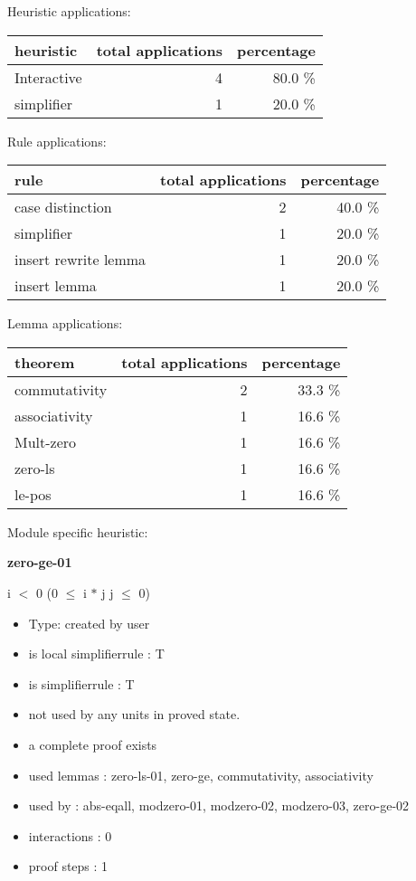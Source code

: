 \documentclass[a4paper]{article}
\begin{document}
\medskip


Heuristic applications:

\begin{supertabular}{l|r|r}
heuristic	& total applications & percentage \\ \hline
Interactive & 4 & 80.0 \% \\
simplifier & 1 & 20.0 \% \\

\end{supertabular}

Rule applications:

\begin{supertabular}{l|r|r}
rule	        & total applications & percentage \\ \hline
case distinction & 2 & 40.0 \% \\
simplifier & 1 & 20.0 \% \\
insert rewrite lemma & 1 & 20.0 \% \\
insert lemma & 1 & 20.0 \% \\

\end{supertabular}

Lemma applications:

\begin{supertabular}{l|r|r}
theorem	        & total applications & percentage \\ \hline
commutativity & 2 & 33.3 \% \\
associativity & 1 & 16.6 \% \\
Mult-zero & 1 & 16.6 \% \\
zero-ls & 1 & 16.6 \% \\
le-pos & 1 & 16.6 \% \\

\end{supertabular}

Module specific heuristic:

\pagebreak

{\LARGE\bf zero-ge-01}\label{lemma-zero-ge-01}

\medskip

 \Fol i $<$ 0 \Imp (0 $\le$ i $*$ j \Equiv j $\le$ 0)

\begin{itemize}

\item Type: created by user

\item is local simplifierrule : T
\item is simplifierrule : T
\item not used by any units in proved state.
\item       a complete proof exists
\item       used lemmas  : zero-ls-01, zero-ge, commutativity, associativity
\item       used by      : abs-eqall, modzero-01, modzero-02, modzero-03, zero-ge-02
\item       interactions : 0
\item       proof steps  : 1
\end{itemize}
\end{document}
